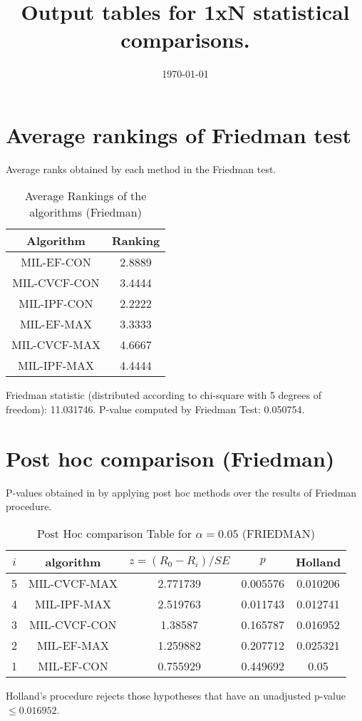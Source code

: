 \documentclass[a4paper,10pt]{article}
\title{Output tables for 1xN statistical comparisons.}
\author{}
\date{\today}
\begin{document}
\begin{landscape}
\pagestyle{empty}
\maketitle
\thispagestyle{empty}

\section{Average rankings of Friedman test}


Average ranks obtained by each method in the Friedman test.

\begin{table}[!htp]
\centering
\begin{tabular}{|c|c|}\hline
Algorithm&Ranking\\\hline
MIL-EF-CON&2.8889\\MIL-CVCF-CON&3.4444\\MIL-IPF-CON&2.2222\\MIL-EF-MAX&3.3333\\MIL-CVCF-MAX&4.6667\\MIL-IPF-MAX&4.4444\\\hline\end{tabular}
\caption{Average Rankings of the algorithms (Friedman)}
\end{table}

Friedman statistic (distributed according to chi-square with 5 degrees of freedom): 11.031746. \newline P-value computed by Friedman Test: 0.050754.\newline


\newpage

\section{Post hoc comparison (Friedman)}


P-values obtained in by applying post hoc methods over the results of Friedman procedure.

\begin{table}[!htp]
\centering\footnotesize
\begin{tabular}{ccccc}
$i$&algorithm&$z=(R_0 - R_i)/SE$&$p$&Holland\\
\hline5&MIL-CVCF-MAX&2.771739&0.005576&0.010206\\4&MIL-IPF-MAX&2.519763&0.011743&0.012741\\3&MIL-CVCF-CON&1.38587&0.165787&0.016952\\2&MIL-EF-MAX&1.259882&0.207712&0.025321\\1&MIL-EF-CON&0.755929&0.449692&0.05\\\hline
\end{tabular}
\caption{Post Hoc comparison Table for $\alpha=0.05$ (FRIEDMAN)}
\end{table}Holland's procedure rejects those hypotheses that have an unadjusted p-value $\le0.016952$.



\end{landscape}
\end{document}
